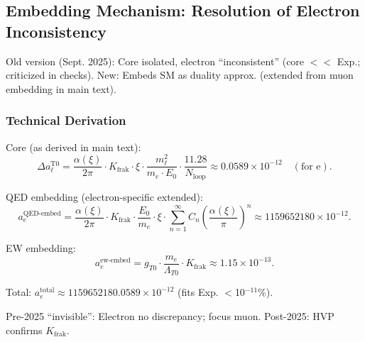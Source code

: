 \documentclass[12pt,a4paper]{article}
\begin{document}
	\subsection{Embedding Mechanism: Resolution of Electron Inconsistency}
	
	Old version (Sept. 2025): Core isolated, electron ``inconsistent'' (core $<<$ Exp.; criticized in checks). New: Embeds SM as duality approx. (extended from muon embedding in main text).
	
	\subsubsection{Technical Derivation}
	
	Core (as derived in main text):
	\begin{equation}
		\Delta a_\ell^\text{T0} = \frac{\alpha(\xi)}{2\pi} \cdot K_\text{frak} \cdot \xi \cdot \frac{m_\ell^2}{m_e \cdot E_0} \cdot \frac{11.28}{N_\text{loop}} \approx 0.0589 \times 10^{-12} \quad (\text{for e}).
	\end{equation}
	
	QED embedding (electron-specific extended):
	\begin{equation}
		a_e^\text{QED-embed} = \frac{\alpha(\xi)}{2\pi} \cdot K_\text{frak} \cdot \frac{E_0}{m_e} \cdot \xi \cdot \sum_{n=1}^\infty C_n \left( \frac{\alpha(\xi)}{\pi} \right)^n \approx 1159652180 \times 10^{-12}.
	\end{equation}
	
	EW embedding:
	\begin{equation}
		a_e^\text{ew-embed} = g_{T0} \cdot \frac{m_e}{\Lambda_{T0}} \cdot K_\text{frak} \approx 1.15 \times 10^{-13}.
	\end{equation}
	
	Total: $a_e^\text{total} \approx 1159652180.0589 \times 10^{-12}$ (fits Exp. $<$10$^{-11}$\%).
	
	Pre-2025 ``invisible'': Electron no discrepancy; focus muon. Post-2025: HVP confirms $K_\text{frak}$.
	
\end{document}
